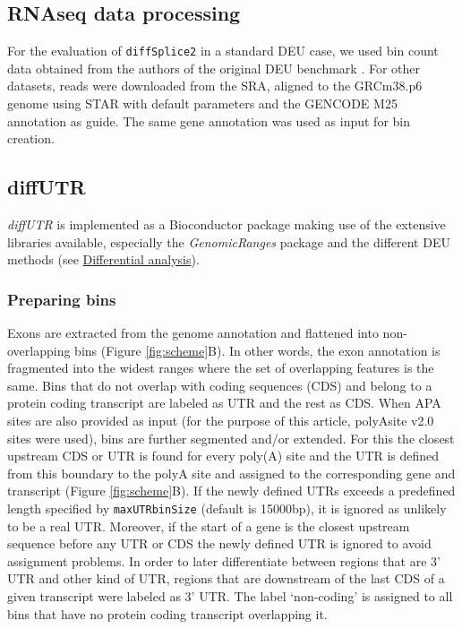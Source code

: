 \documentclass{bmcart}
\begin{document}
\subsection{RNAseq data processing}

For the evaluation of \texttt{diffSplice2} in a standard DEU case, we used bin count data obtained from the authors of the original DEU benchmark \cite{Soneson2016IsoformUsage}. For other datasets, reads were downloaded from the SRA, aligned to the GRCm38.p6 genome using STAR with default parameters and the GENCODE M25 annotation as guide. The same gene annotation was used as input for bin creation.

\subsection{diffUTR}

\textit{diffUTR} is implemented as a Bioconductor package making use of the extensive libraries available, especially the \textit{GenomicRanges} package \cite{Lawrence2013SoftwareRanges} and the different DEU methods (see \hyperref[sec:DE]{Differential analysis}).

\subsubsection{Preparing bins}
\label{sec:bins}

Exons are extracted from the genome annotation and flattened into non-overlapping bins (Figure \ref{fig:scheme}B). In other words, the exon annotation is fragmented into the widest ranges where the set of overlapping features is the same. Bins that do not overlap with coding sequences (CDS) and belong to a protein coding transcript are labeled as UTR and the rest as CDS. When APA sites are also provided as input (for the purpose of this article, polyAsite v2.0 sites were used), bins are further segmented and/or extended. For this the closest upstream CDS or UTR is found for every poly(A) site and the UTR is defined from this boundary to the polyA site and assigned to the corresponding gene and transcript (Figure \ref{fig:scheme}B). If the newly defined UTRs exceeds a predefined length specified by \texttt{maxUTRbinSize} (default is 15000bp), it is ignored as unlikely to be a real UTR. Moreover, if the start of a gene is the closest upstream sequence before any UTR or CDS the newly defined UTR is ignored to avoid assignment problems. In order to later differentiate between regions that are 3' UTR and other kind of UTR, regions that are downstream of the last CDS of a given transcript were labeled as 3' UTR. The label `non-coding' is assigned to all bins that have no protein coding transcript overlapping it.
\end{document}
